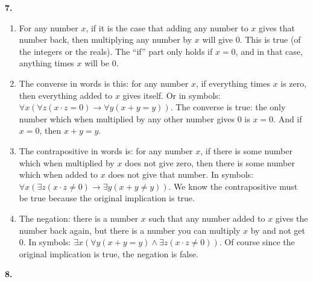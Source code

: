 \documentclass[10pt,]{book}
\theoremstyle{plain}
\theoremstyle{definition}
\theoremstyle{definition}
\theoremstyle{definition}
\numberwithin{equation}{chapter}
\def\imp{\rightarrow}
\begin{document}
\par\smallskip
\noindent\textbf{7.}\quad{}\leavevmode%
\begin{enumerate}[label=(\alph*)]
\item\hypertarget{li-1149}{}
                For any number \(x\), if it is the case that adding any number to \(x\) gives that number back, then multiplying any number by \(x\) will give 0. This is true (of the integers or the reals). The ``if'' part only holds if \(x = 0\), and in that case, anything times \(x\) will be 0.
\item\hypertarget{li-1150}{}
                The converse in words is this: for any number \(x\), if everything times \(x\) is zero, then everything added to \(x\) gives itself. Or in symbols: \(\forall x (\forall z (x \cdot z = 0) \imp \forall y (x + y = y))\). The converse is true: the only number which when multiplied by any other number gives 0 is \(x = 0\). And if \(x = 0\), then \(x + y = y\).
\item\hypertarget{li-1151}{}
                The contrapositive in words is: for any number \(x\), if there is some number which when multiplied by \(x\) does not give zero, then there is some number which when added to \(x\) does not give that number. In symbols: \(\forall x (\exists z (x\cdot z \ne 0) \imp \exists y (x + y \ne y))\). We know the contrapositive must be true because the original implication is true.
\item\hypertarget{li-1152}{}
                The negation: there is a number \(x\) such that any number added to \(x\) gives the number back again, but there is a number you can multiply \(x\) by and not get 0. In symbols: \(\exists x (\forall y (x + y = y) \wedge \exists z (x \cdot z \ne 0))\). Of course since the original implication is true, the negation is false.
\end{enumerate}
\par\smallskip
\noindent\textbf{8.}\quad{}\leavevmode%
\end{document}
